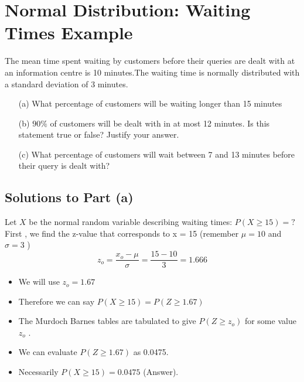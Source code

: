 \documentclass[a4paper,12pt]{article}
\begin{document}
\section*{Normal Distribution: Waiting Times Example}
The mean time spent waiting by customers before their queries are dealt with at an information centre is 10 minutes.The waiting time is normally distributed with a standard deviation of 3 minutes.
\begin{itemize}
	\item [(a)] What percentage of customers will be waiting longer than 15 minutes
	
	\item [(b)] $90\%$ of customers will be dealt with in at most 12 minutes. Is this statement true or false?
	Justify your answer.
	
	\item [(c)] What percentage of customers will wait between 7 and 13 minutes before their query is dealt with?
\end{itemize}


	
	
\subsection*{Solutions to Part (a)}

Let $X$ be the normal random variable describing waiting times: 
$P(X \geq 15) = ?$ \\
\bigskip
First , we find the z-value that corresponds to x = 15  (remember $\mu=10$ and $\sigma=3$  )\\
\[ z_o = { \frac{x_o - \mu} { \sigma }}  = {\frac{ 15 - 10}{ 3 }} = 1.666 \]
\begin{itemize}
	\item We will use $z_o =1.67$
	\item Therefore we can say $P(X \geq 15 ) = P(Z \geq 1.67)$
	\item The Murdoch Barnes tables are tabulated to give $P(Z \geq z_o)$ for some value $ z_o$ .
	\item We can evaluate $P(Z \geq 1.67)$  as 0.0475.
	\item Necessarily $P(X \geq 15) = 0.0475$ (Answer).
\end{itemize}

\end{document}
